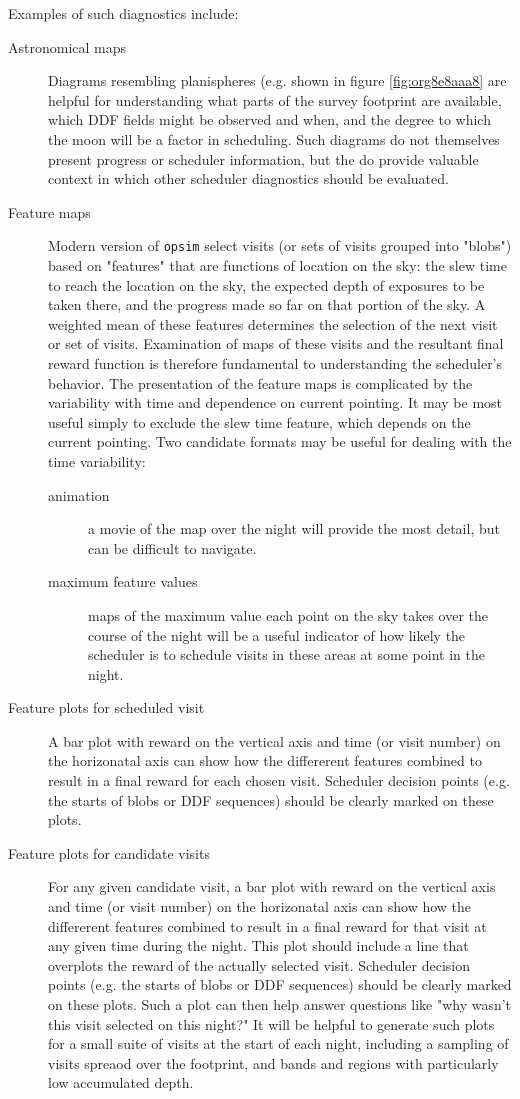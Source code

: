 Examples of such diagnostics include:
\begin{description}
\item[{Astronomical maps}] Diagrams resembling planispheres (e.g. shown in figure \ref{fig:org8e8aaa8} are helpful for understanding what parts of the survey footprint are available, which DDF fields might be observed and when, and the degree to which the moon will be a factor in scheduling. Such diagrams do not themselves present progress or scheduler information, but the do provide valuable context in which other scheduler diagnostics should be evaluated.
\item[{Feature maps}] Modern version of \texttt{opsim} select visits (or sets of visits grouped into "blobs") based on "features" that are functions of location on the sky: the slew time to reach the location on the sky, the expected depth of exposures to be taken there, and the progress made so far on that portion of the sky. A weighted mean of these features determines the selection of the next visit or set of visits. Examination of maps of these visits and the resultant final reward function is therefore fundamental to understanding the scheduler's behavior. The presentation of the feature maps is complicated by the variability with time and dependence on current pointing. It may be most useful simply to exclude the slew time feature, which depends on the current pointing. Two candidate formats may be useful for dealing with the time variability:
\begin{description}
\item[{animation}] a movie of the map over the night will provide the most detail, but can be difficult to navigate.
\item[{maximum feature values}] maps of the maximum value each point on the sky takes over the course of the night will be a useful indicator of how likely the scheduler is to schedule visits in these areas at some point in the night.
\end{description}
\item[{Feature plots for scheduled visit}] A bar plot with reward on the vertical axis and time (or visit number) on the horizonatal axis can show how the differerent features combined to result in a final reward for each chosen visit. Scheduler decision points (e.g. the starts of blobs or DDF sequences) should be clearly marked on these plots.
\item[{Feature plots for candidate visits}] For any given candidate visit, a bar plot with reward on the vertical axis and time (or visit number) on the horizonatal axis can show how the differerent features combined to result in a final reward for that visit at any given time during the night. This plot should include a line that overplots the reward of the actually selected visit.  Scheduler decision points (e.g. the starts of blobs or DDF sequences) should be clearly marked on these plots. Such a plot can then help answer questions like "why wasn't this visit selected on this night?" It will be helpful to generate such plots for a small suite of visits at the start of each night, including a sampling of visits spreaod over the footprint, and bands and regions with particularly low accumulated depth.

\end{description}
